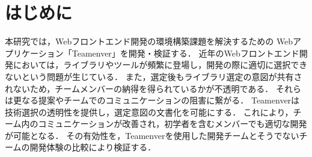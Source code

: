 \documentclass[main]{subfiles}
\begin{document}
\section{はじめに }
本研究では，Webフロントエンド開発の環境構築課題を解決するための
Webアプリケーション「Teamenver」を開発・検証する．
近年のWebフロントエンド開発においては，ライブラリやツールが頻繁に登場し，開発の際に適切に選択できないという問題が生じている．
また，選定後もライブラリ選定の意図が共有されないため，チームメンバーの納得を得られているかが不透明である．
それらは更なる提案やチームでのコミュニケーションの阻害に繋がる．
Teamenverは技術選択の透明性を提供し，選定意図の文書化を可能にする．
これにより，チーム内のコミュニケーションが改善され，初学者を含むメンバーでも適切な開発が可能となる．
その有効性を，Teamenverを使用した開発チームとそうでないチームの開発体験の比較により検証する．
\end{document}
